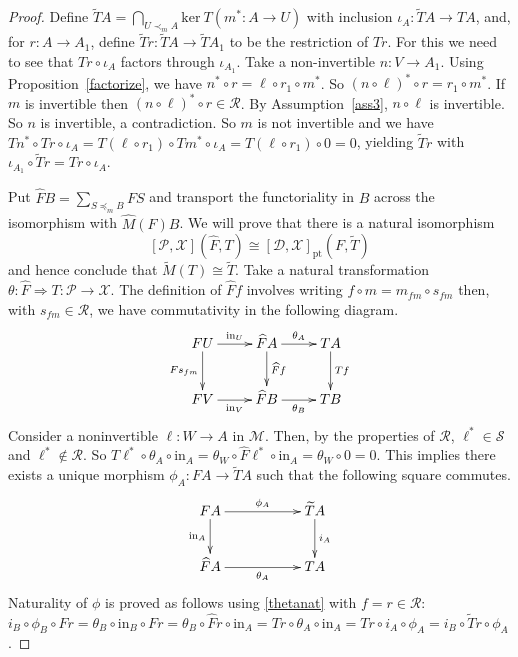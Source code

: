 \documentclass[a4paper,12pt,reqno]{amsart}
\theoremstyle{definition}
\theoremstyle{fact}
\theoremstyle{genquest}
\theoremstyle{step}
\newcommand{\dd}{\colon}
\newcommand{\lra}{\longrightarrow}
\newcommand{\ra}{\rightarrow}
\def\CD{{\mathscr D}}
\def\CM{{\mathscr M}}
\def\CP{{\mathscr P}}
\def\CR{{\mathscr R}}
\def\CS{{\mathscr S}}
\def\CX{{\mathscr X}}
\begin{document}
\begin{proof}
Define $\widetilde{T}A = \bigcap_{U\prec_m A} {\mathrm{ker} \ {T(m^*\dd A\ra U)}}$ 
with inclusion $\iota_A \dd \widetilde{T}A \ra TA$,
and, for $r\dd A\ra A_1$, define $\widetilde{T}r \dd \widetilde{T}A \ra \widetilde{T}A_1$ to be the restriction of $Tr$.
For this we need to see that $Tr \circ \iota_A$ factors through $\iota_{A_1}$.
Take a non-invertible $n\dd V\ra A_1$. Using Proposition~\ref{factorize}, we have $n^*\circ r = \ell \circ r_1 \circ m^*$. So $(n\circ \ell)^*\circ r = r_1\circ m^*$. If $m$ is invertible then $(n\circ \ell)^*\circ r \in \CR$. By Assumption~\ref{ass3}, $n\circ \ell$ is invertible. So $n$ is invertible, a contradiction. So $m$ is not invertible and we have 
$Tn^*\circ Tr \circ \iota_A = T(\ell \circ r_1) \circ Tm^* \circ \iota_A = T(\ell \circ r_1) \circ 0 = 0$, yielding $\widetilde{T}r$ with 
$\iota_{A_1} \circ \widetilde{T}r = Tr \circ \iota_A$.         

Put $\widehat{F}B = \sum_{S\preceq_m B}{FS}$ and transport the functoriality in $B$
across the isomorphism with $\widehat{M}(F)B$.
We will prove that there is a natural isomorphism
$$[\CP,\CX](\widehat{F}, T) \cong [\CD,\CX]_{\mathrm{pt}}(F,\widetilde{T})$$
and hence conclude that $\widetilde{M}(T) \cong \widetilde{T}$.
Take a natural transformation $\theta \dd \widehat{F}\Rightarrow T \dd \CP \ra \CX$. 
The definition of $\widehat{F}f$ involves writing $f\circ m = m_{fm} \circ s_{fm}$ then, 
with $s_{fm}\in \CR$, we have commutativity in the following diagram. 
\begin{equation}\label{thetanat}
\begin{aligned}
\xymatrix{
FU \ar[r]^-{\mathrm{in}_U} \ar[d]_-{Fs_{fm}} & \widehat{F}A \ar[d]^-{\widehat{F}f} \ar[r]^-{\theta_A} & TA \ar[d]^-{Tf}\\
FV \ar[r]_-{\mathrm{in}_V} & \widehat{F}B \ar[r]_-{\theta_B} & TB}
\end{aligned}
\end{equation}
Consider a noninvertible $\ell \dd W \ra A$ in $\CM$. 
Then, by the properties of $\CR$, $\ell^* \in \CS$ and $\ell^* \notin \CR$.
So $T\ell^*\circ \theta_A \circ \mathrm{in}_{A} = \theta_W \circ \widehat{F}\ell^*\circ \mathrm{in}_{A} = \theta_W \circ 0 = 0$. This implies there exists a unique morphism $\phi_A \dd FA \lra \widetilde{T}A$ 
such that the following square commutes.
\begin{equation}\label{defphi}
\begin{aligned}
\xymatrix{
FA \ar[rr]^-{\phi_A} \ar[d]_-{\mathrm{in}_A} && \widetilde{T}A \ar[d]^-{i_A} \\
\widehat{F}A \ar[rr]_-{\theta_A} && TA}
\end{aligned}
\end{equation}
Naturality of $\phi$ is proved as follows using \eqref{thetanat} with $f=r \in \CR$:
$i_B\circ \phi_B\circ Fr = \theta_B \circ \mathrm{in}_{B} \circ Fr = \theta_B \circ \widehat{F}r \circ \mathrm{in}_{A} = Tr \circ \theta_A \circ \mathrm{in}_{A} = Tr \circ i_A \circ \phi_A = i_B\circ \widetilde{T}r\circ \phi_A $. 


\end{proof}
\end{document}

